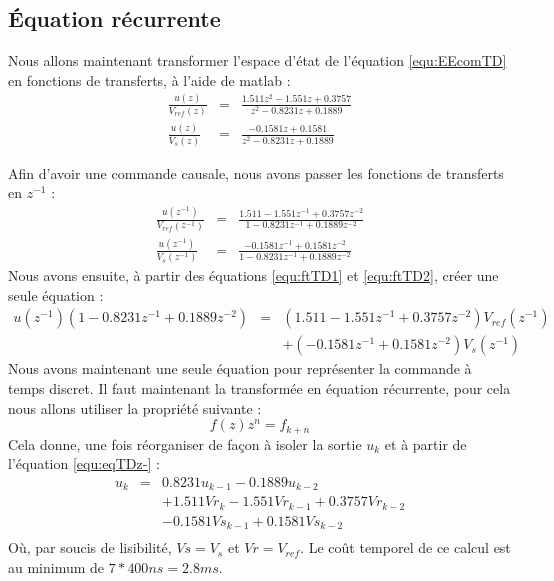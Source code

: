  

 


	\subsection{Équation récurrente}
	Nous allons maintenant transformer l'espace d'état de l'équation \ref{equ:EEcomTD} en fonctions de transferts, à l'aide de matlab :
\begin{eqnarray}
\frac{u(z)}{V_{ref}(z)}	&=&	\frac{1.511 z^2 - 1.551 z + 0.3757}{    z^2 - 0.8231 z +  0.1889}\\
\frac{u(z)}{V_s(z)} &=& \frac{-0.1581 z + 0.1581}{    z^2 - 0.8231 z +  0.1889}
\end{eqnarray}


Afin d'avoir une commande causale, nous avons passer les fonctions de transferts en $z^{-1}$ :
\begin{eqnarray}
\label{equ:ftTD1}\frac{u(z^{-1})}{V_{ref}(z^{-1})} &=& \frac{1.511 - 1.551 z^{-1} + 0.3757 z^{-2}}{    1 - 0.8231 z^{-1} +  0.1889z^{-2}}\\
\label{equ:ftTD2}\frac{u(z^{-1})}{V_s(z^{-1})}	&=&	\frac{-0.1581 z^{-1} + 0.1581z^{-2}}{    1 - 0.8231 z^{-1} +  0.1889z^{-2}}
\end{eqnarray}
Nous avons ensuite, à partir des équations \ref{equ:ftTD1} et  \ref{equ:ftTD2}, créer une seule équation :
\begin{equation}
\label{equ:eqTDz-}
\begin{array}{lcl}
u(z^{-1})(1 - 0.8231 z^{-1} +  0.1889 z^{-2}) &=& (1.511 - 1.551 z^{-1} + 0.3757 z^{-2})  V_{ref}(z^{-1}) \\
&&+ (-0.1581 z^{-1} + 0.1581z^{-2})V_{s}(z^{-1})
\end{array}
\end{equation}
Nous avons maintenant une seule équation pour représenter la commande à temps discret.%
Il faut maintenant la transformée en équation récurrente, pour cela nous allons utiliser la propriété suivante :
\begin{equation}
f(z)z^n = f_{k+n}
\end{equation}
Cela donne, une fois réorganiser de façon à isoler la sortie $u_k$ et à partir de l'équation \ref{equ:eqTDz-} :
\begin{equation}
\begin{array}{lcl}
u_k &=&  0.8231 u_{k-1} - 0.1889  u_{k-2} \\
&& + 1.511 Vr_k - 1.551 Vr_{k-1}  + 0.3757 Vr_{k-2}\\
&& - 0.1581 Vs_{k-1} + 0.1581 Vs_{k-2}  \\
\end{array}
\end{equation}
Où, par soucis de lisibilité, $Vs = V_s$ et $Vr = V_{ref}$.
Le coût temporel de ce calcul est au minimum de $7*400ns = 2.8 ms$.




